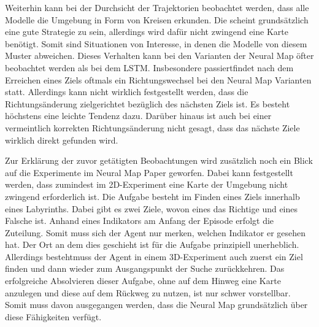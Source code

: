 Weiterhin kann bei der Durchsicht der Trajektorien beobachtet werden, dass alle Modelle die Umgebung in Form von Kreisen erkunden. Die scheint grundsätzlich eine gute Strategie zu sein, allerdings wird dafür nicht zwingend eine Karte benötigt. Somit sind Situationen von Interesse, in denen die Modelle von diesem Muster abweichen. Dieses Verhalten kann bei den Varianten der Neural Map öfter beobachtet werden als bei dem LSTM. Insbesondere passiertfindet nach dem Erreichen eines Ziels oftmals ein Richtungswechsel bei den Neural Map Varianten statt. Allerdings kann nicht wirklich festgestellt werden, dass die Richtungsänderung zielgerichtet bezüglich des nächsten Ziels ist. Es besteht höchstens eine leichte Tendenz dazu. Darüber hinaus ist auch bei einer vermeintlich korrekten Richtungsänderung nicht gesagt, dass das nächste Ziele wirklich direkt gefunden wird.

Zur Erklärung der zuvor getätigten Beobachtungen wird zusätzlich noch ein Blick auf die Experimente im Neural Map Paper geworfen. Dabei kann festgestellt werden, dass zumindest im 2D-Experiment eine Karte der Umgebung nicht zwingend erforderlich ist. Die Aufgabe besteht im Finden eines Ziels innerhalb eines Labyrinths. Dabei gibt es zwei Ziele, wovon eines das Richtige und eines Falsche ist. Anhand eines Indikators am Anfang der Episode erfolgt die Zuteilung. Somit muss sich der Agent nur merken, welchen Indikator er gesehen hat. Der Ort an dem dies geschieht ist für die Aufgabe prinzipiell unerheblich. Allerdings bestehtmuss der Agent in einem 3D-Experiment auch zuerst ein Ziel finden und dann wieder zum Ausgangspunkt der Suche zurückkehren. Das erfolgreiche Absolvieren dieser Aufgabe, ohne auf dem Hinweg eine Karte anzulegen und diese auf dem Rückweg zu nutzen, ist nur schwer vorstellbar. Somit muss davon ausgegangen werden, dass die Neural Map grundsätzlich über diese Fähigkeiten verfügt.

